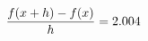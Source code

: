\documentclass[preview]{standalone}
\begin{document}
\begin{align*}
\special{dvisvgm:raw <g id='unique000'>}\frac{f(x+h)-f(x)}{h} = 2.004\special{dvisvgm:raw </g>}
\end{align*}
\end{document}
